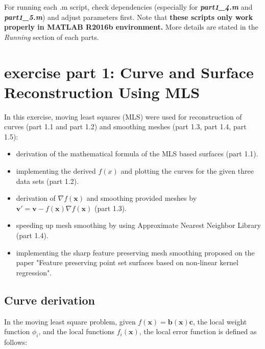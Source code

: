 \documentclass[paper=a4, fontsize=11pt]{scrartcl} %
\numberwithin{equation}{section} %
\numberwithin{figure}{section} %
\numberwithin{table}{section} %
\newcommand{\filename}[1]{\textbf{\textit{#1}}}
\renewcommand{\vec}[1]{\mathbf{#1}}
\begin{document}
For running each .m script, check dependencies (especially for \filename{part1\_4.m} and \filename{part1\_5.m}) and adjust parameters first. Note that \textbf{these scripts only work properly in MATLAB R2016b environment.} More details are stated in the \textit{Running} section of each parts.


\section{exercise part 1: Curve and Surface Reconstruction Using MLS}

In this exercise, moving least squares (MLS) were used for reconstruction of curves (part 1.1 and part 1.2) and smoothing meshes (part 1.3, part 1.4, part 1.5): 

\begin{itemize}
\item derivation of the mathematical formula of the MLS based surfaces (part 1.1).
\item implementing the derived $f(x)$ and plotting the curves for the given three data sets (part 1.2). 
\item derivation of $\nabla f(\vec{x})$ and smoothing provided meshes by $\vec{v'} = \vec{v} - f(\vec{x}) \nabla f(\vec{x})$ (part 1.3). 
\item speeding up mesh smoothing by using Approximate Nearest Neighbor Library (part 1.4). 
\item implementing the sharp feature preserving mesh smoothing proposed on the paper "Feature preserving point set surfaces based on non-linear kernel regression".
\end{itemize}  


\pagebreak

\subsection{Curve derivation}

In the moving least square problem, given $f(\vec{x}) = \vec{b}(\vec{x})\vec{c}$, the local weight function $\phi_i$, and the local functions $f_i(\vec{x})$, the local error function is defined as follows:
\end{document}
